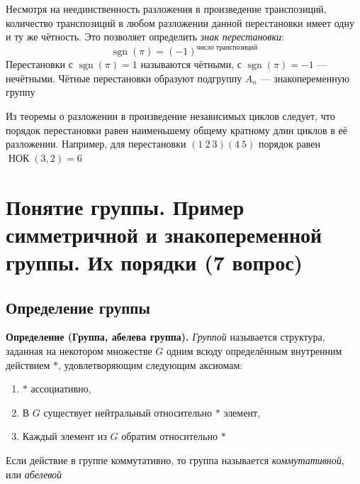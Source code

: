 \documentclass[a4paper,12pt]{article}
\theoremstyle{definition}
\theoremstyle{plain}
\theoremstyle{remark}
\begin{document}
	\begin{tcolorbox}[colback=purple!5, colframe=purple!50!black, title=Заметочка: Чётность перестановки]
		Несмотря на неединственность разложения в произведение транспозиций, количество транспозиций в любом разложении данной перестановки имеет одну и ту же чётность. Это позволяет определить \textit{знак перестановки}:
		\[
		\operatorname{sgn}(\pi) = (-1)^{\text{число транспозиций}}
		\]
		Перестановки с $\operatorname{sgn}(\pi) = 1$ называются чётными, с $\operatorname{sgn}(\pi) = -1$ — нечётными. Чётные перестановки образуют подгруппу $A_n$ — знакопеременную группу
	\end{tcolorbox}
	
	\begin{tcolorbox}[colback=yellow!5, colframe=orange!60!black, title=Важное замечание]
		Из теоремы о разложении в произведение независимых циклов следует, что порядок перестановки равен наименьшему общему кратному длин циклов в её разложении. Например, для перестановки $(1\ 2\ 3)(4\ 5)$ порядок равен $\operatorname{НОК}(3, 2) = 6$
	\end{tcolorbox}
	
	
	
	\newpage
	\section{Понятие группы. Пример симметричной и знакопеременной группы. Их порядки (7 вопрос)}
	
	\subsection{Определение группы}
	
	\noindent \textbf{Определение (Группа, абелева группа).}
	\textit{Группой} называется структура, заданная на некотором множестве $G$ одним всюду определённым внутренним действием $*$, удовлетворяющим следующим аксиомам:
	\begin{enumerate}
		\item $*$ ассоциативно,
		\item В $G$ существует нейтральный относительно $*$ элемент,
		\item Каждый элемент из $G$ обратим относительно $*$
	\end{enumerate}
	
	Если действие в группе коммутативно, то группа называется \textit{коммутативной}, или \textit{абелевой}
	
\end{document}
